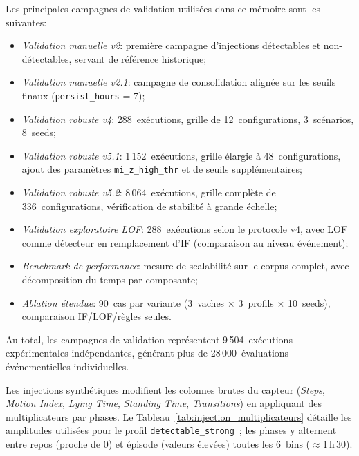 Les principales campagnes de validation utilisées dans ce mémoire sont les suivantes:
\begin{itemize}
  \item \textit{Validation manuelle v2}: première campagne d'injections détectables et
  non-détectables, servant de référence historique;
  \item \textit{Validation manuelle v2.1}: campagne de consolidation alignée sur les seuils
  finaux (\texttt{persist\_hours} = 7);
  \item \textit{Validation robuste v4}: 288~exécutions, grille de 12~configurations,
  3~scénarios, 8~seeds;
  \item \textit{Validation robuste v5.1}: 1\,152~exécutions, grille élargie à 48~configurations,
  ajout des paramètres \texttt{mi\_z\_high\_thr} et de seuils supplémentaires;
  \item \textit{Validation robuste v5.2}: 8\,064~exécutions, grille complète de 336~configurations,
  vérification de stabilité à grande échelle;
  \item \textit{Validation exploratoire LOF}: 288~exécutions selon le protocole v4, avec LOF
  comme détecteur en remplacement d'IF (comparaison au niveau événement);
  \item \textit{Benchmark de performance}: mesure de scalabilité sur le corpus complet,
  avec décomposition du temps par composante;
  \item \textit{Ablation étendue}: 90~cas par variante (3~vaches $\times$ 3~profils
  $\times$ 10~seeds), comparaison IF/LOF/règles seules.
\end{itemize}

Au total, les campagnes de validation représentent 9\,504~exécutions expérimentales
indépendantes, générant plus de 28\,000~évaluations événementielles individuelles.


Les injections synthétiques modifient les colonnes brutes du capteur (\textit{Steps}, \textit{Motion Index},
\textit{Lying Time}, \textit{Standing Time}, \textit{Transitions}) en appliquant des multiplicateurs par phases.
Le Tableau~\ref{tab:injection_multiplicateurs} détaille les amplitudes utilisées pour le
profil \texttt{detectable\_strong}~; les phases y alternent entre repos (proche de 0)
et épisode (valeurs élevées) toutes les 6~bins ($\approx$1\,h\,30).

